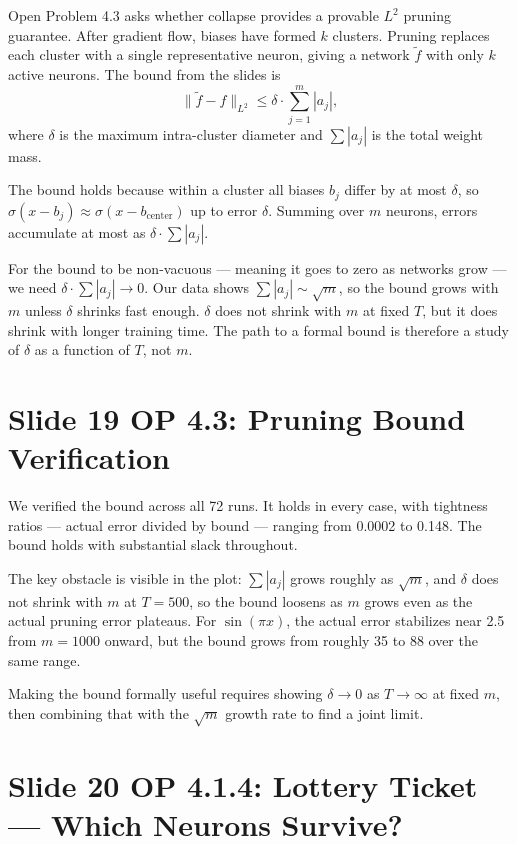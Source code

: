 \documentclass[11pt]{article}
\begin{document}
Open Problem 4.3 asks whether collapse provides a provable $L^2$ pruning guarantee.
After gradient flow, biases have formed $k$ clusters.
Pruning replaces each cluster with a single representative neuron, giving a network $\tilde{f}$ with only $k$ active neurons.
The bound from the slides is
\[
  \|\tilde{f} - f\|_{L^2} \leq \delta \cdot \sum_{j=1}^m |a_j|,
\]
where $\delta$ is the maximum intra-cluster diameter and $\sum|a_j|$ is the total weight mass.

The bound holds because within a cluster all biases $b_j$ differ by at most $\delta$, so $\sigma(x - b_j) \approx \sigma(x - b_{\text{center}})$ up to error $\delta$.
Summing over $m$ neurons, errors accumulate at most as $\delta \cdot \sum|a_j|$.

For the bound to be non-vacuous --- meaning it goes to zero as networks grow --- we need $\delta \cdot \sum|a_j| \to 0$.
Our data shows $\sum|a_j| \sim \sqrt{m}$, so the bound grows with $m$ unless $\delta$ shrinks fast enough.
$\delta$ does not shrink with $m$ at fixed $T$, but it does shrink with longer training time.
The path to a formal bound is therefore a study of $\delta$ as a function of $T$, not $m$.

\section*{Slide 19 \quad OP 4.3: Pruning Bound Verification}

We verified the bound across all 72 runs.
It holds in every case, with tightness ratios --- actual error divided by bound --- ranging from 0.0002 to 0.148.
The bound holds with substantial slack throughout.

The key obstacle is visible in the plot: $\sum|a_j|$ grows roughly as $\sqrt{m}$, and $\delta$ does not shrink with $m$ at $T = 500$, so the bound loosens as $m$ grows even as the actual pruning error plateaus.
For $\sin(\pi x)$, the actual error stabilizes near 2.5 from $m = 1000$ onward, but the bound grows from roughly 35 to 88 over the same range.

Making the bound formally useful requires showing $\delta \to 0$ as $T \to \infty$ at fixed $m$, then combining that with the $\sqrt{m}$ growth rate to find a joint limit.

\section*{Slide 20 \quad OP 4.1.4: Lottery Ticket --- Which Neurons Survive?}
\end{document}
